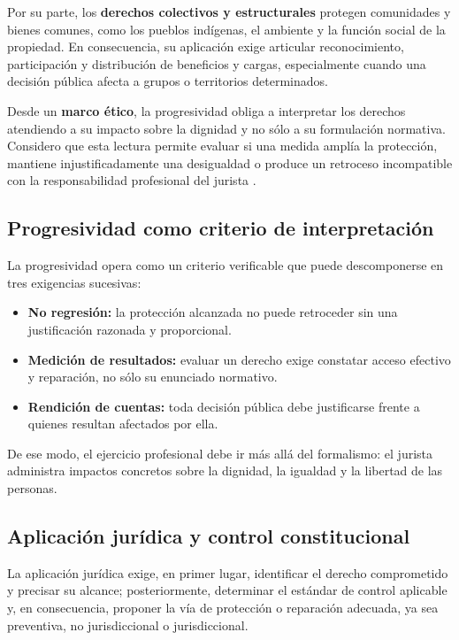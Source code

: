\documentclass[
	spanish,
	letterpaper, oneside
]{article}
\begin{document}
Por su parte, los \textbf{derechos colectivos y estructurales} protegen comunidades y bienes comunes, como los pueblos indígenas, el ambiente y la función social de la propiedad. En consecuencia, su aplicación exige articular reconocimiento, participación y distribución de beneficios y cargas, especialmente cuando una decisión pública afecta a grupos o territorios determinados.

Desde un \textbf{marco ético}, la progresividad obliga a interpretar los derechos atendiendo a su impacto sobre la dignidad y no sólo a su formulación normativa. Considero que esta lectura permite evaluar si una medida amplía la protección, mantiene injustificadamente una desigualdad o produce un retroceso incompatible con la responsabilidad profesional del jurista \citep{singerCompendioEtica1995,ronquilloarmasEticaGeneralProfesional2018}.

\subsection{Progresividad como criterio de interpretación}

La progresividad opera como un criterio verificable que puede descomponerse en tres exigencias sucesivas:

\begin{itemize}
  \item \textbf{No regresión:} la protección alcanzada no puede retroceder sin una justificación razonada y proporcional.
  \item \textbf{Medición de resultados:} evaluar un derecho exige constatar acceso efectivo y reparación, no sólo su enunciado normativo.
  \item \textbf{Rendición de cuentas:} toda decisión pública debe justificarse frente a quienes resultan afectados por ella.
\end{itemize}

De ese modo, el ejercicio profesional debe ir más allá del formalismo: el jurista administra impactos concretos sobre la dignidad, la igualdad y la libertad de las personas.

\subsection{Aplicación jurídica y control constitucional}

La aplicación jurídica exige, en primer lugar, identificar el derecho comprometido y precisar su alcance; posteriormente, determinar el estándar de control aplicable y, en consecuencia, proponer la vía de protección o reparación adecuada, ya sea preventiva, no jurisdiccional o jurisdiccional.
\end{document}
